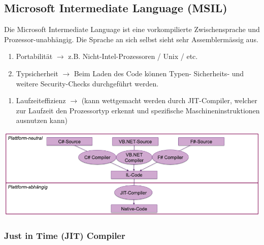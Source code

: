 \subsection{Microsoft Intermediate Language (MSIL)}
Die Microsoft Intermediate Language ist eine vorkompilierte Zwischensprache und Prozessor-unabhängig.
Die Sprache an sich selbst sieht sehr Assemblermässig aus.\\
\begin{enumerate}
   \item Portabilität $\rightarrow$ z.B. Nicht-Intel-Prozessoren / Unix / etc.
   \item Typsicherheit $\rightarrow$ Beim Laden des Code können Typen- Sicherheits- und weitere Security-Checks durchgeführt werden.
\end{enumerate}

\begin{enumerate}
   \item Laufzeiteffizienz $\rightarrow$ (kann wettgemacht werden durch JIT-Compiler, welcher zur Laufzeit den Prozessortyp erkennt und spezifische Maschineninstruktionen ausnutzen kann)
\end{enumerate}

    \begin{center}
    \includegraphics[scale=0.28]{graphic/grundlagen/Grundlagen_MSIL.png}
    \end{center}


\subsubsection{Just in Time (JIT) Compiler}

